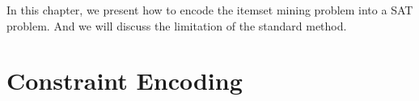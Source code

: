 In this chapter, we present how to encode the itemset mining problem into a SAT problem. And we will discuss the limitation of the standard method.
\section{Constraint Encoding}